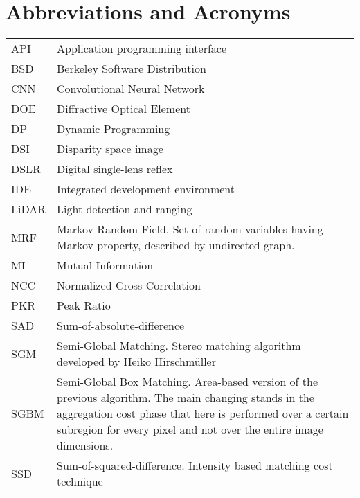 \chapter*{Abbreviations and Acronyms}


\noindent
\begin{longtable}{@{}p{}p{}@{}}
API & Application programming interface \\
BSD & Berkeley Software Distribution \\
CNN & Convolutional Neural Network \\
DOE & Diffractive Optical Element \\
DP & Dynamic Programming \\
DSI & Disparity space image \\
DSLR & Digital single-lens reflex \\
IDE & Integrated development environment \\
LiDAR & Light detection and ranging \\
MRF & Markov Random Field. Set of random variables having Markov property, described by undirected graph. \\ 
MI & Mutual Information \\
NCC & Normalized Cross Correlation \\
PKR & Peak Ratio \\
SAD & Sum-of-absolute-difference \\
SGM & Semi-Global Matching. Stereo matching algorithm developed by Heiko Hirschm\"{u}ller \\
SGBM & Semi-Global Box Matching. Area-based version of the previous algorithm. The main changing stands in the aggregation cost phase that here is performed over a certain subregion for every pixel and not over the entire image dimensions.\\
SSD & Sum-of-squared-difference. Intensity based matching cost technique\\
\end{longtable}
